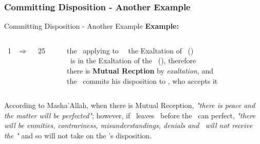 \subsubsection{Committing Disposition - Another Example}
\begin{frame}[t]{Committing Disposition - Another Example}
\textbf{Example:}\footnotemark[1]
\begin{columns}[T, onlytextwidth]
\Sun\ 1 \Libra\ $\Rightarrow$ \Opposition\ \Saturn\ 25 \Aries

\rule{.1mm}{.20\textheight}

the \Sun\ applying to \Opposition\ \Saturn\  the Exaltation of \Saturn\ (\Libra) \\
\Saturn\ is in the Exaltation of the \Sun\ (\Aries), therefore \\
there is \textbf{Mutual Recption} by \textsl{exaltation}, and \\
the \Sun\ commits his disposition to \Saturn, who accepts it
\end{columns}
\vspace{0.5cm}
According to Masha'Allah, when there is Mutual Reception, \textsl{"there is peace and the matter will be perfected"}; however, if \Saturn\ leaves \Aries\ before the \Opposition\ can perfect, \textsl{"there will be enmities, contrariness, misunderstandings, denials and \Saturn\ will not receive the \Sun"} and so will not take on the \Sun's disposition.

\end{frame}
